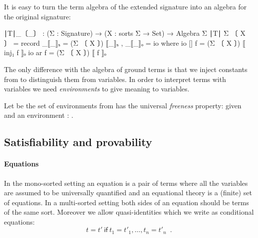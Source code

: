 It is easy to turn the term algebra of the extended signature
into an algebra for the original signature:
\begin{spec}
∣T∣_〔_〕 : (Σ : Signature) → (X : sorts Σ → Set) → Algebra Σ
∣T∣ Σ 〔 X 〕  = record { _⟦_⟧ₛ =  (Σ 〔 X 〕) ⟦_⟧ₛ , _⟦_⟧ₒ = io }
  where  io {[]}  f  =  (Σ 〔 X 〕) ⟦ inj₁ f ⟧ₒ
         io {ar}  f  =  (Σ 〔 X 〕) ⟦ f ⟧ₒ
\end{spec}
\noindent The only difference with the algebra of ground terms is that
we inject constants from  to distinguish them from variables. In
order to interpret terms with variables we need \emph{environments} to
give meaning to variables.

Let  be the set of
environments from  has the
universal \emph{freeness} property: given  and an
environment  :
.

\subsection{Satisfiability and provability}

\paragraph*{Equations} In the mono-sorted setting an equation is a pair
of terms where all the variables are assumed to be universally
quantified and an equational theory is a (finite) set of equations.
In a  multi-sorted setting both sides of an equation should be terms
of the same sort. Moreover we allow quasi-identities which we
write as conditional equations:
\[ t = t'\ \mathsf{if} \  t_1 = t'_1, \ldots, t_n = t'_n \enspace . \]

